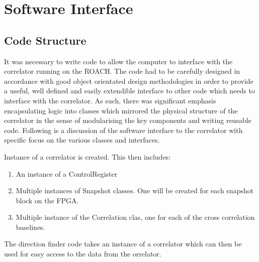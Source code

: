 \chapter{Software Interface}
\label{ch:software-design}

\section{Code Structure}
It was necessary to write code to allow the computer to interface with the correlator running on the ROACH.
The code had to be carefully designed in accordance with good object orientated design methodologies in order to provide a useful, well defined and easily extendible interface to other code which needs to interface with the correlator.
As such, there was significant emphasis encapsulating logic into classes which mirrored the physical structure of the correlator in the sense of modularising the key components and writing reusable code.
Following is a discussion of the software interface to the correlator with specific focus on the various classes and interfaces.

Instance of a correlator is created.
This then includes:
\begin{enumerate}
  \item An instance of a ControlRegister
  \item Multiple instances of Snapshot classes. One will be created for each snapshot block on the FPGA.
  \item Multiple instance of the Correlation clas, one for each of the cross correlation baselines.
\end{enumerate}

The direction finder code takes an instance of a correlator which can then be used for easy access to the data from the orrelator.

